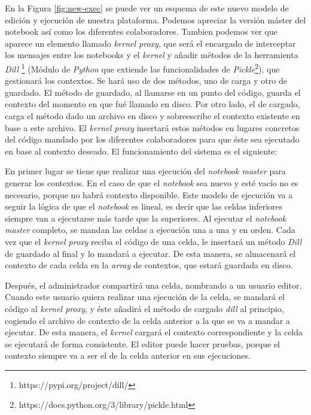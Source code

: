 \documentclass[11pt,spanish,listoffigures]{tfgetsinf}
\begin{document}
En la Figura \ref{fig:new-exec} se puede ver un esquema de este nuevo modelo de edición y ejecución de nuestra plataforma. Podemos apreciar la versión máster del notebook así como los diferentes colaboradores. Tambien podemos ver que aparece un elemento llamado \textit{kernel proxy}, que será el encargado de interceptar los mensajes entre los notebooks y el \textit{kernel} y añadir métodos de la herramienta \textit{Dill} \footnote{https://pypi.org/project/dill/} (Módulo de \textit{Python} que extiende las funcionalidades de \textit{Pickle}\footnote{https://docs.python.org/3/library/pickle.html}), que gestionará los contextos. Se hará uso de dos métodos, uno de carga y otro de guardado. El método de guardado, al llamarse en un punto del código, guarda el contexto del momento en que fué llamado en disco. Por otro lado, el de cargado, carga el método dado un archivo en disco y sobreescribe el contexto existente en base a este archivo. El \textit{kernel proxy} insertará estos métodos en lugares concretos del código mandado por los diferentes colaboradores para que éste sea ejecutado en base al contexto deseado. El funcionamiento del sistema es el siguiente:

En primer lugar se tiene que realizar una ejecución del \textit{notebook master} para generar los contextos. En el caso de que el \textit{notebook} sea nuevo y esté vacío no es necesario, porque no habrá contexto disponible. Este modelo de ejecución va a seguir la lógica de que el \textit{notebook} es lineal, es decir que las celdas inferiores siempre van a ejecutarse más tarde que la superiores. Al ejecutar el \textit{notebook master} completo, se mandan las celdas a ejecución una a una y en orden. Cada vez que el \textit{kernel proxy} reciba el código de una celda, le insertará un método \textit{Dill} de guardado al final y lo mandará a ejecutar. De esta manera, se almacenará el contexto de cada celda en la \textit{array} de contextos, que estará guardada en disco. 

Después, el administrador compartirá una celda, nombrando a un usuario editor. Cuando este usuario quiera realizar una ejecución de la celda, se mandará el código al \textit{kernel proxy}, y éste añadirá el método de cargado \textit{dill} al principio, cogiendo el archivo de contexto de la celda anterior a la que se va a mandar a ejecutar. De esta manera, el \textit{kernel} cargará el contexto correspondiente y la celda se ejecutará de forma consistente. El editor puede hacer pruebas, porque el contexto siempre va a ser el de la celda anterior en sus ejecuciones.
\end{document}

